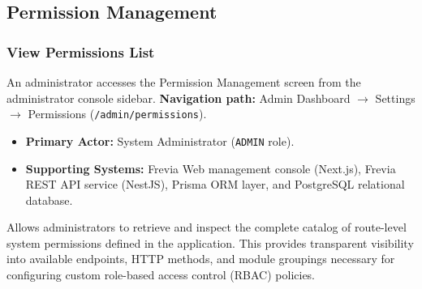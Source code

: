 
\subsection{Permission Management}

\subsubsection{ View Permissions List}

An administrator accesses the Permission Management screen from the administrator console sidebar.\newline
\textbf{Navigation path:} Admin Dashboard $\rightarrow$ Settings $\rightarrow$ Permissions (\texttt{/admin/permissions}).


\begin{itemize}[leftmargin=1.6em,topsep=3pt,itemsep=2pt,parsep=0pt,label=$\bullet$]
    \item \textbf{Primary Actor:} System Administrator (\texttt{ADMIN} role).
    \item \textbf{Supporting Systems:} Frevia Web management console (Next.js), Frevia REST API service (NestJS), Prisma ORM layer, and PostgreSQL relational database.
\end{itemize}

\noindent Allows administrators to retrieve and inspect the complete catalog of route-level system permissions defined in the application. This provides transparent visibility into available endpoints, HTTP methods, and module groupings necessary for configuring custom role-based access control (RBAC) policies.

